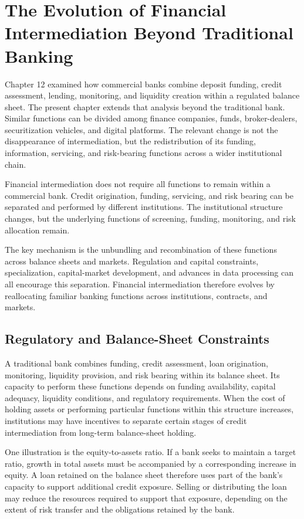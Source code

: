 \section[The Evolution of Financial Intermediation Beyond Traditional Banking]{The Evolution of Financial Intermediation Beyond Traditional Banking}

Chapter 12 examined how commercial banks combine deposit funding, credit assessment, lending, monitoring, and liquidity creation within a regulated balance sheet. The present chapter extends that analysis beyond the traditional bank. Similar functions can be divided among finance companies, funds, broker-dealers, securitization vehicles, and digital platforms. The relevant change is not the disappearance of intermediation, but the redistribution of its funding, information, servicing, and risk-bearing functions across a wider institutional chain.

Financial intermediation does not require all functions to remain within a commercial bank. Credit origination, funding, servicing, and risk bearing can be separated and performed by different institutions. The institutional structure changes, but the underlying functions of screening, funding, monitoring, and risk allocation remain.

The key mechanism is the unbundling and recombination of these functions across balance sheets and markets. Regulation and capital constraints, specialization, capital-market development, and advances in data processing can all encourage this separation. Financial intermediation therefore evolves by reallocating familiar banking functions across institutions, contracts, and markets.


\subsection{Regulatory and Balance-Sheet Constraints}

A traditional bank combines funding, credit assessment, loan
origination, monitoring, liquidity provision, and risk bearing
within its balance sheet. Its capacity to perform these
functions depends on funding availability, capital adequacy,
liquidity conditions, and regulatory requirements. When the
cost of holding assets or performing particular functions
within this structure increases, institutions may have
incentives to separate certain stages of credit
intermediation from long-term balance-sheet holding.

One illustration is the equity-to-assets ratio. If a bank
seeks to maintain a target ratio, growth in total assets
must be accompanied by a corresponding increase in equity.
A loan retained on the balance sheet therefore uses part
of the bank's capacity to support additional credit exposure.
Selling or distributing the loan may reduce the resources
required to support that exposure, depending on the extent
of risk transfer and the obligations retained by the bank.

